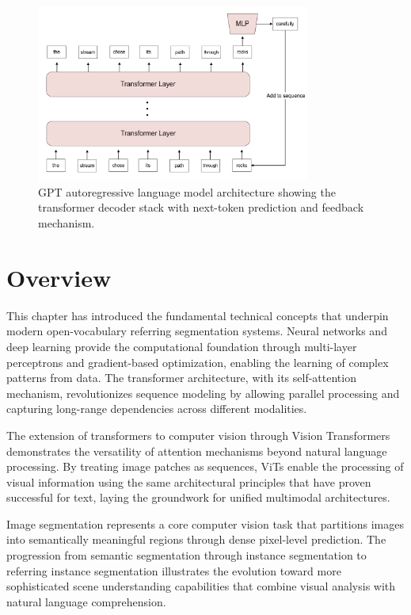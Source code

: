 \begin{figure}[htbp]
\centering
\includegraphics[width=0.8\textwidth]{../Images/gpt.png}
\caption{GPT autoregressive language model architecture showing the transformer decoder stack with next-token prediction and feedback mechanism.}
\label{fig:gpt}
\end{figure}

\section{Overview}

This chapter has introduced the fundamental technical concepts that underpin modern open-vocabulary referring segmentation systems. Neural networks and deep learning provide the computational foundation through multi-layer perceptrons and gradient-based optimization, enabling the learning of complex patterns from data. The transformer architecture, with its self-attention mechanism, revolutionizes sequence modeling by allowing parallel processing and capturing long-range dependencies across different modalities.

The extension of transformers to computer vision through Vision Transformers demonstrates the versatility of attention mechanisms beyond natural language processing. By treating image patches as sequences, ViTs enable the processing of visual information using the same architectural principles that have proven successful for text, laying the groundwork for unified multimodal architectures.

Image segmentation represents a core computer vision task that partitions images into semantically meaningful regions through dense pixel-level prediction. The progression from semantic segmentation through instance segmentation to referring instance segmentation illustrates the evolution toward more sophisticated scene understanding capabilities that combine visual analysis with natural language comprehension.

